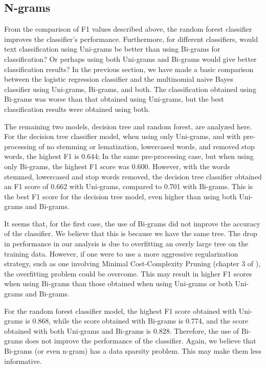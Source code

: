 \documentclass[a4paper, 11pt]{article}
\begin{document}
\begin{multicols}{2}


\subsection{N-grams}
From the comparison of F1 values described above, the random forest classifier improves the classifier's performance. Furthermore, for different classifiers, would text classification using Uni-grams be better than using Bi-grams for classification? Or perhaps using both Uni-grams and Bi-grams would give better classification results? In the previous section, we have made a basic comparison between the logistic regression classifier and the multinomial naive Bayes classifier using Uni-grams, Bi-grams, and both. The classification obtained using Bi-grams was worse than that obtained using Uni-grams, but the best classification results were obtained using both. 

The remaining two models, decision tree and random forest, are analyzed here. For the decision tree classifier model, when using only Uni-grams, and with pre-processing of no stemming or lematization, lowercased words, and removed stop words, the highest F1 is 0.644; In the same pre-processing case, but when using only Bi-grams, the highest F1 score was 0.600. However, with the words stemmed, lowercased and stop words removed, the decision tree classifier obtained an F1 score of 0.662 with Uni-grams, compared to 0.701 with Bi-grams. This is the best F1 score for the decision tree model, even higher than using both Uni-grams and Bi-grams. 

It seems that, for the first case, the use of Bi-grams did not improve the accuracy of the classifier. We believe that this is because we have the same tree. The drop in performance in our analysis is due to overfitting an overly large tree on the training data. However, if one were to use a more aggressive regularization strategy, such as one involving Minimal Cost-Complexity Pruning (chapter 3 of \cite{breiman2017classification}), the overfitting problem could be overcome. This may result in higher F1 scores when using Bi-grams than those obtained when using Uni-grams or both Uni-grams and Bi-grams.

For the random forest classifier model, the highest F1 score obtained with Uni-grams is 0.868, while the score obtained with Bi-grams is 0.774, and the score obtained with both Uni-grams and Bi-grams is 0.828. Therefore, the use of Bi-grams does not improve the performance of the classifier. Again, we believe that Bi-grams (or even n-gram) has a data sparsity problem. This may make them less informative.


\end{multicols}
\end{document}
